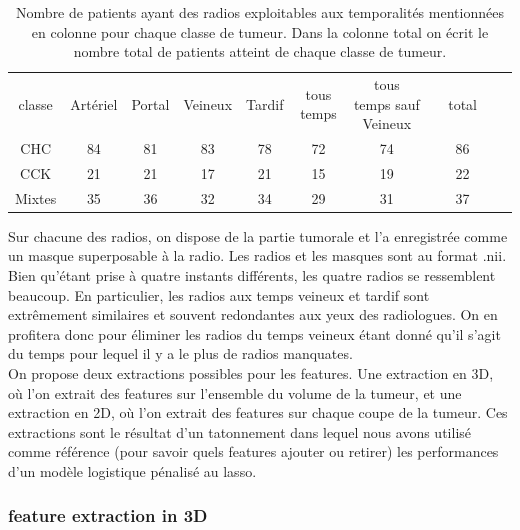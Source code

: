 \documentclass[10pt]{article}
\begin{document}
\begin{table}[tbp]
    \centering
    \caption{Nombre de patients ayant des radios exploitables aux temporalités mentionnées en colonne pour chaque classe de tumeur. Dans la colonne total on écrit le nombre total de patients atteint de chaque classe de tumeur.}
    \label{tab:nb_tumeurs}
    \begin{tabular}{|c|c|c|c|c|c|c|c|c|c|c|}
        \cline{1-7} \cline{9-9}
        classe & Artériel & Portal & Veineux & Tardif & tous temps & tous temps sauf Veineux & & total \\
        \cline{1-7} \cline{9-9}
        CHC & 84 & 81 & 83 & 78 & 72 & 74 & & 86\\
        \cline{1-7} \cline{9-9}
        CCK & 21 & 21 & 17 & 21 & 15 & 19 & & 22\\
        \cline{1-7} \cline{9-9}
        Mixtes & 35 & 36 & 32 & 34 & 29 & 31 & & 37\\
        \cline{1-7} \cline{9-9}
    \end{tabular}
\end{table}

Sur chacune des radios, on dispose de la partie tumorale et l'a enregistrée comme un masque superposable à la radio. Les radios et les masques sont au format .nii. Bien qu'étant prise à quatre instants différents, les quatre radios se ressemblent beaucoup. En particulier, les radios aux temps veineux et tardif sont extrêmement similaires et souvent redondantes aux yeux des radiologues. On en profitera donc pour éliminer les radios du temps veineux étant donné qu'il s'agit du temps pour lequel il y a le plus de radios manquates.\\
On propose deux extractions possibles pour les features. Une extraction en 3D, où l'on extrait des features sur l'ensemble du volume de la tumeur, et une extraction en 2D, où l'on extrait des features sur chaque coupe de la tumeur. Ces extractions sont le résultat d'un tatonnement dans lequel nous avons utilisé comme référence (pour savoir quels features ajouter ou retirer) les performances d'un modèle logistique pénalisé au lasso.\\

\subsubsection{feature extraction in 3D}
\end{document}
